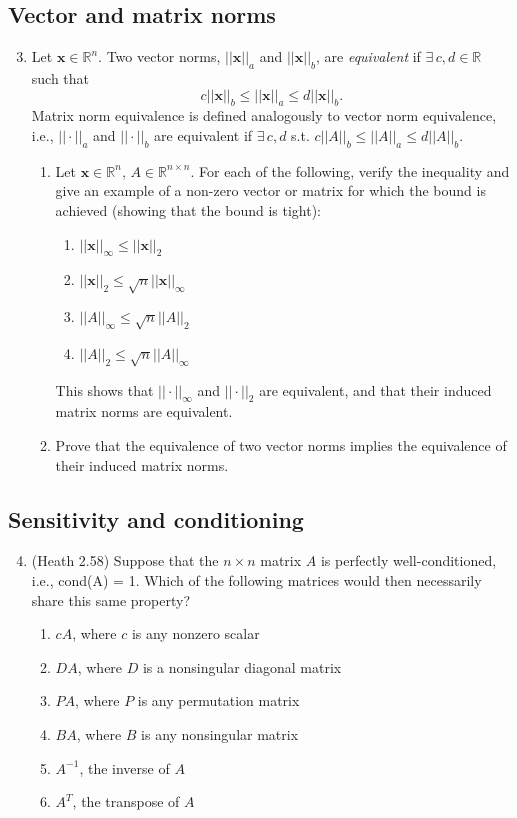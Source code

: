 \documentclass{article}
\renewcommand{\vec}[1]{\mathbf{#1}}
\begin{document}
\subsection*{Vector and matrix norms}
\begin{enumerate}
\setcounter{enumi}{2}
\item Let $\vec{x} \in \mathbb{R}^n$. Two vector norms, $||\vec{x}||_a$ and $||\vec{x}||_b$, are \emph{equivalent} if
  $\exists \, c,d \in \mathbb{R}$ such that
$$c||\vec{x}||_b \leq ||\vec{x}||_a \leq d||\vec{x}||_b.$$
Matrix norm equivalence is defined analogously to vector norm equivalence, i.e., $||\cdot||_a$ and $||\cdot||_b$ are
equivalent if $\exists \, c,d$ s.t. $c||A||_b \leq ||A||_a \leq d||A||_b$.
  \begin{enumerate}
  \item Let $\vec{x} \in \mathbb{R}^n, \, A \in \mathbb{R}^{n \times n}$.  For each of the following, verify the inequality and give an example of a non-zero vector or matrix for which the
  bound is achieved (showing that the bound is tight):
    \begin{enumerate}
      \item $||\vec{x}||_\infty \leq ||\vec{x}||_2$
      \item $||\vec{x}||_2 \leq \sqrt{n} ||\vec{x}||_\infty$
      \item $||A||_\infty \leq \sqrt{n} ||A||_2$
      \item $||A||_2 \leq \sqrt{n} ||A||_\infty$
    \end{enumerate}
  This shows that $||\cdot||_\infty$ and $||\cdot||_2$ are equivalent, and that their induced matrix norms are equivalent.
  \item Prove that the equivalence of two vector norms implies the equivalence of their induced matrix norms.
  \end{enumerate}
\end{enumerate}

\subsection*{Sensitivity and conditioning}
\begin{enumerate}
\setcounter{enumi}{3}
\item (Heath 2.58) Suppose that the $n \times n$ matrix $A$ is perfectly well-conditioned, i.e., cond(A) = 1.  Which of the following matrices would then necessarily share this same
  property?
\begin{enumerate}
\item $cA$, where $c$ is any nonzero scalar \Large \checkmark \normalsize
\item $DA$, where $D$ is a nonsingular diagonal matrix
\item $PA$, where $P$ is any permutation matrix \Large \checkmark \normalsize
\item $BA$, where $B$ is any nonsingular matrix
\item $A^{-1}$, the inverse of $A$ \Large \checkmark \normalsize
\item $A^T$, the transpose of $A$
\end{enumerate}
\end{enumerate}
\end{document}
